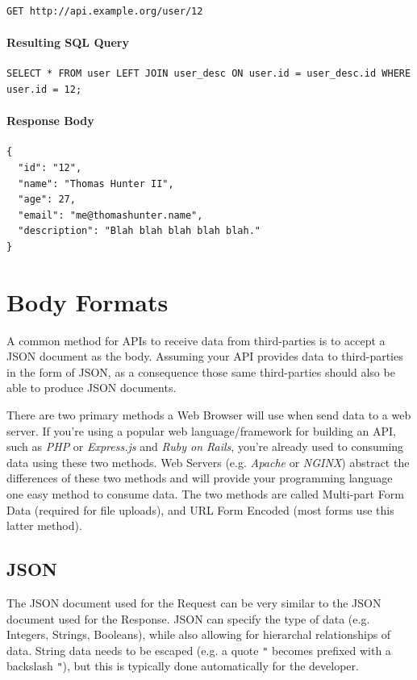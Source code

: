 \documentclass{book}
\begin{document}
\begin{verbatim}
GET http://api.example.org/user/12
\end{verbatim}

\paragraph{\textbf{Resulting SQL Query}}

\begin{verbatim}
SELECT * FROM user LEFT JOIN user_desc ON user.id = user_desc.id WHERE user.id = 12;
\end{verbatim}

\paragraph{\textbf{Response Body}}

\begin{verbatim}
{
  "id": "12",
  "name": "Thomas Hunter II",
  "age": 27,
  "email": "me@thomashunter.name",
  "description": "Blah blah blah blah blah."
}
\end{verbatim}


\section{Body Formats}

A common method for APIs to receive data from third-parties is to accept a JSON document as the body. Assuming your API provides data to third-parties in the form of JSON, as a consequence those same third-parties should also be able to produce JSON documents.

There are two primary methods a Web Browser will use when send data to a web server. If you're using a popular web language/framework for building an API, such as \emph{PHP} or \emph{Express.js} and \emph{Ruby on Rails}, you're already used to consuming data using these two methods. Web Servers (e.g. \emph{Apache} or \emph{NGINX}) abstract the differences of these two methods and will provide your programming language one easy method to consume data. The two methods are called Multi-part Form Data (required for file uploads), and URL Form Encoded (most forms use this latter method).

\subsection{JSON}

The JSON document used for the Request can be very similar to the JSON document used for the Response. JSON can specify the type of data (e.g. Integers, Strings, Booleans), while also allowing for hierarchal relationships of data. String data needs to be escaped (e.g. a quote \texttt{"} becomes prefixed with a backslash \texttt{"}), but this is typically done automatically for the developer.
\end{document}
